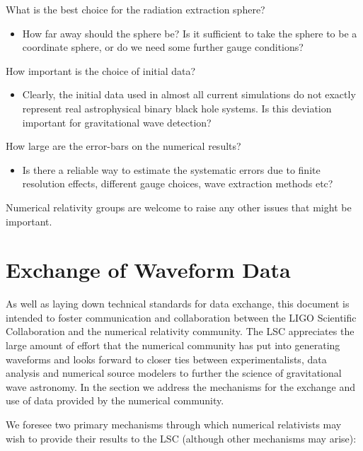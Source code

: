 \documentclass[10pt]{ligodcc}
\begin{document}
What is the best choice for the radiation extraction sphere?
\begin{itemize}
\item How far away should the sphere be?  Is it sufficient to take the
  sphere to be a coordinate sphere, or do we need some further gauge
  conditions?
\end{itemize}
How important is the choice of initial data?
\begin{itemize}
\item Clearly, the initial data used in almost all current simulations
  do not exactly represent real astrophysical binary black hole
  systems.  Is this deviation important for gravitational wave
  detection?
\end{itemize}
How large are the error-bars on the numerical results?
\begin{itemize}
\item Is there a reliable way to estimate the systematic errors due to
  finite resolution effects, different gauge choices, wave extraction
  methods etc?  
\end{itemize}

Numerical relativity groups are welcome to raise any other issues that
might be important.


\section{Exchange of Waveform Data}
\label{sec:authorship}

As well as laying down technical standards for data exchange, this document is
intended to foster communication and collaboration between the LIGO Scientific
Collaboration and the numerical relativity community. The LSC appreciates the
large amount of effort that the numerical community has put into generating
waveforms and looks forward to closer ties between experimentalists, data
analysis and numerical source modelers to further the science of
gravitational wave astronomy. In the section we address the mechanisms for the
exchange and use of data provided by the numerical community.

We foresee two primary mechanisms through which numerical relativists may wish
to provide their results to the LSC (although other mechanisms may arise):
\end{document}
